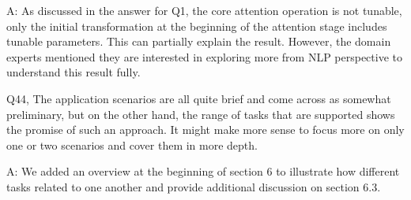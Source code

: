 A: As discussed in the answer for Q1, the core attention operation is not tunable, only the initial transformation at the beginning of the attention stage includes tunable parameters. This can partially explain the result. However, the domain experts mentioned they are interested in exploring more from NLP perspective to understand this result fully.

Q44, The application scenarios are all quite brief and come across as somewhat preliminary, but on the other hand, the range of tasks that are supported shows the promise of such an approach. It might make more sense to focus more on only one or two scenarios and cover them in more depth.

A: We added an overview at the beginning of section 6 to illustrate how different tasks related to one another and provide additional discussion on section 6.3.
